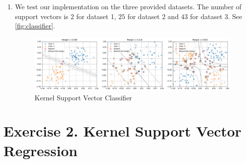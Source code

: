 \documentclass[french]{article}
\begin{document}
\begin{enumerate}
\begin{enumerate}
    \inputminted{python}{snippets/ex1_q2c.py}
    \item We test our implementation on the three provided datasets. The number of support vectors is
    $2$ for dataset 1, $25$ for dataset $2$ and $43$ for dataset $3$. See \autoref{fig:classifier}.
    \begin{figure}
        \centering
        \includegraphics[width=\textwidth]{figures/classifier.png}
        \caption{Kernel Support Vector Classifier}
        \label{fig:classifier}
    \end{figure}
    \end{enumerate}
\end{enumerate}

\section{Exercise 2. Kernel Support Vector Regression}
\end{document}
